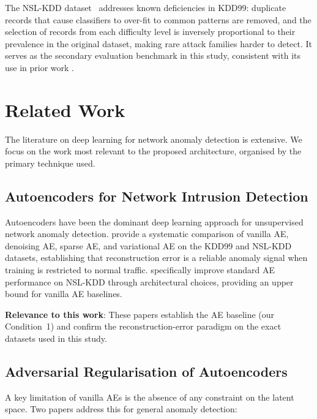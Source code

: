 \documentclass[12pt,a4paper]{article}
\begin{document}
The NSL-KDD dataset~\citep{tavallaee2009detailed} addresses known deficiencies
in KDD99: duplicate records that cause classifiers to over-fit to common
patterns are removed, and the selection of records from each difficulty level
is inversely proportional to their prevalence in the original dataset, making
rare attack families harder to detect. It serves as the secondary evaluation
benchmark in this study, consistent with its use in prior work
\citep{vae_attention_lstm,ae_analysis_nids}.

\section{Related Work}
\label{sec:related}

The literature on deep learning for network anomaly detection is extensive.
We focus on the work most relevant to the proposed architecture, organised by
the primary technique used.

\subsection{Autoencoders for Network Intrusion Detection}

Autoencoders have been the dominant deep learning approach for unsupervised
network anomaly detection. \citet{ae_analysis_nids} provide a systematic
comparison of vanilla AE, denoising AE, sparse AE, and variational AE on the
KDD99 and NSL-KDD datasets, establishing that reconstruction error is a reliable
anomaly signal when training is restricted to normal traffic. \citet{improving_ae_nslkdd}
specifically improve standard AE performance on NSL-KDD through architectural
choices, providing an upper bound for vanilla AE baselines.

\textbf{Relevance to this work}: These papers establish the AE baseline (our
Condition~1) and confirm the reconstruction-error paradigm on the exact datasets
used in this study.

\subsection{Adversarial Regularisation of Autoencoders}

A key limitation of vanilla AEs is the absence of any constraint on the latent
space. Two papers address this for general anomaly detection:
\end{document}
